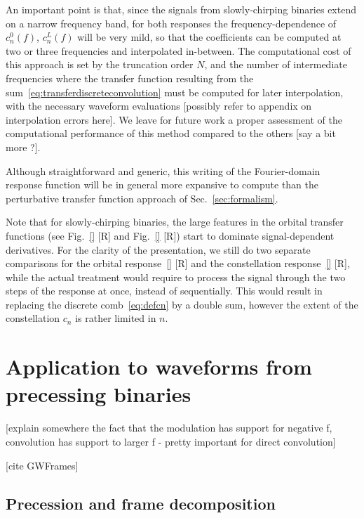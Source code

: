 \documentclass[aps,showpacs,twocolumn,
prd,superscriptaddress,nofootinbib]{revtex4-1}
\newcommand{\SM}[1]{{\color{Red} #1}}
\begin{document}
An important point is that, since the signals from slowly-chirping binaries extend on a narrow frequency band, for both responses the frequency-dependence of $c_{n}^{0}(f)$, $c_{n}^{L}(f)$ will be very mild, so that the coefficients can be computed at two or three frequencies and interpolated in-between. The computational cost of this approach is set by the truncation order $N$, and the number of intermediate frequencies where the transfer function resulting from the sum~\eqref{eq:transferdiscreteconvolution} must be computed for later interpolation, with the necessary waveform evaluations \SM{[possibly refer to appendix on interpolation errors here]}. We leave for future work a proper assessment of the computational performance of this method compared to the others \SM{[say a bit more ?]}. 

Although straightforward and generic, this writing of the Fourier-domain response function will be in general more expansive to compute than the perturbative transfer function approach of Sec.~\ref{sec:formalism}.

Note that for slowly-chirping binaries, the large features in the orbital transfer functions (see Fig.~\ref{} \SM{[R]} and Fig.~\ref{} \SM{[R]}) start to dominate signal-dependent derivatives. For the clarity of the presentation, we still do two separate comparisons for the orbital response~\eqref{} \SM{[R]} and the constellation response~\eqref{} \SM{[R]}, while the actual treatment would require to process the signal through the two steps of the response at once, instead of sequentially. This would result in replacing the discrete comb~\eqref{eq:defcn} by a double sum, however the extent of the constellation $c_{n}$ is rather limited in $n$.


\section{Application to waveforms from precessing binaries}
\label{sec:precession}

\SM{[explain somewhere the fact that the modulation has support for negative f, convolution has support to larger f - pretty important for direct convolution]}

\SM{[cite GWFrames]}


\subsection{Precession and frame decomposition}
\label{subsec:precdef}
\end{document}

